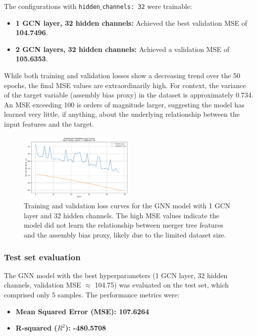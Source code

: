 \documentclass[twocolumn]{aastex631}
\begin{document}
The configurations with \texttt{hidden\ensuremath{\_}channels: 32} were trainable:
\begin{itemize}
    \item \textbf{1 GCN layer, 32 hidden channels:} Achieved the best validation MSE of \textbf{104.7496}.
    \item \textbf{2 GCN layers, 32 hidden channels:} Achieved a validation MSE of \textbf{105.6353}.
\end{itemize}

While both training and validation losses show a decreasing trend over the 50 epochs, the final MSE values are extraordinarily high. For context, the variance of the target variable (assembly bias proxy) in the dataset is approximately 0.734. An MSE exceeding 100 is orders of magnitude larger, suggesting the model has learned very little, if anything, about the underlying relationship between the input features and the target.

\begin{figure}[htbp]
    \centering
    \includegraphics[width=0.5\textwidth]{../input_files/plots/training_validation_loss_curves_plot_1_1748137938.png}
    \caption{\label{fig:training_validation_loss}Training and validation loss curves for the GNN model with 1 GCN layer and 32 hidden channels. The high MSE values indicate the model did not learn the relationship between merger tree features and the assembly bias proxy, likely due to the limited dataset size.}
\end{figure}

\subsubsection{Test set evaluation}
The GNN model with the best hyperparameters (1 GCN layer, 32 hidden channels, validation MSE $\approx$ 104.75) was evaluated on the test set, which comprised only 5 samples. The performance metrics were:
\begin{itemize}
    \item \textbf{Mean Squared Error (MSE): 107.6264}
    \item \textbf{R-squared ($R^2$): -480.5708}
\end{itemize}
\end{document}
